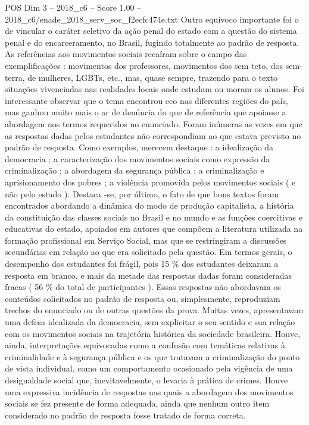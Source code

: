 \begin{textsample}{POS Dim 3 – 2018\_c6 – Score 1.00 – 2018\_c6/enade\_2018\_serv\_soc\_f2ecfc474e.txt}
Outro equívoco importante foi o de vincular o caráter seletivo da ação penal do estado com a questão do sistema penal e do encarceramento, no Brasil, fugindo totalmente ao padrão de resposta.
As referências aos movimentos sociais recaíram sobre o campo das exemplificações : movimentos dos professores, movimentos dos sem teto, dos sem-terra, de mulheres, LGBTs, etc., mas, quase sempre, trazendo para o texto situações vivenciadas nas realidades locais onde estudam ou moram os alunos.
Foi interessante observar que o tema encontrou eco nas diferentes regiões do país, mas ganhou muito mais o ar de denúncia do que de referência que apoiasse a abordagem nos termos requeridos no enunciado.
Foram inúmeras as vezes em que as respostas dadas pelos estudantes não correspondiam ao que estava previsto no padrão de resposta.
Como exemplos, merecem destaque : a idealização da democracia ; a caracterização dos movimentos sociais como expressão da criminalização ; a abordagem da segurança pública ; a criminalização e aprisionamento dos pobres ; a violência promovida pelos movimentos sociais ( e não pelo estado ).
Destaca -se, por último, o fato de que bons textos foram encontrados abordando a dinâmica do modo de produção capitalista, a história da constituição das classes sociais no Brasil e no mundo e as funções coercitivas e educativas do estado, apoiados em autores que compõem a literatura utilizada na formação profissional em Serviço Social, mas que se restringiram a discussões secundárias em relação ao que era solicitado pela questão.
Em termos gerais, o desempenho dos estudantes foi frágil, pois 15 \% dos estudantes deixaram a resposta em branco, e mais da metade das respostas dadas foram consideradas fracas ( 56 \% do total de participantes ).
Essas respostas não abordavam os conteúdos solicitados no padrão de resposta ou, simplesmente, reproduziam trechos do enunciado ou de outras questões da prova.
Muitas vezes, apresentavam uma defesa idealizada da democracia, sem explicitar o seu sentido e sua relação com os movimentos sociais na trajetória histórica da sociedade brasileira.
Houve, ainda, interpretações equivocadas como a confusão com temáticas relativas à criminalidade e à segurança pública e os que tratavam a criminalização do ponto de vista individual, como um comportamento ocasionado pela vigência de uma desigualdade social que, inevitavelmente, o levaria à prática de crimes.
Houve uma expressiva incidência de respostas nas quais a abordagem dos movimentos sociais se fez presente de forma adequada, ainda que nenhum outro item considerado no padrão de resposta fosse tratado de forma correta.

\end{textsample}
